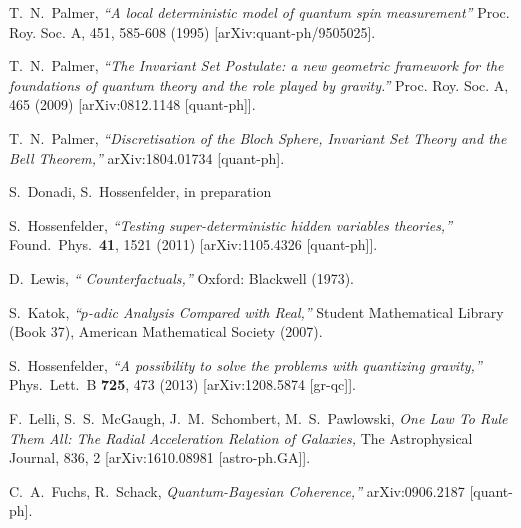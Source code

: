 \documentclass[12pt]{article}
\begin{document}
\begin{thebibliography}{99}
  T.~N.~Palmer,
  {\sl ``A local deterministic model of quantum spin measurement''}
  Proc. Roy. Soc. A, 451, 585-608 (1995) 	[arXiv:quant-ph/9505025]. 
 

  T.~N.~Palmer,
  {\sl ``The Invariant Set Postulate: a new geometric framework for the foundations of quantum theory and the role played by gravity.''}
  Proc. Roy. Soc. A, 465 (2009) 	[arXiv:0812.1148 [quant-ph]]. 


  T.~N.~Palmer,
  {\sl ``Discretisation of the Bloch Sphere, Invariant Set Theory and the Bell Theorem,''}
  arXiv:1804.01734 [quant-ph].
  
   S.~Donadi, S.~Hossenfelder, in preparation
  
  S.~Hossenfelder,
  {\sl ``Testing super-deterministic hidden variables theories,''}
  Found.\ Phys.\  {\bf 41}, 1521 (2011)
  [arXiv:1105.4326 [quant-ph]].
  
  D.~Lewis, {\sl `` Counterfactuals,''} Oxford: Blackwell (1973). 
  
   S.~Katok, {\sl ``$p$-adic Analysis Compared with Real,''} Student Mathematical Library (Book 37), American Mathematical Society (2007).

  S.~Hossenfelder,
  {\sl ``A possibility to solve the problems with quantizing gravity,''}
  Phys.\ Lett.\ B {\bf 725}, 473 (2013)
  [arXiv:1208.5874 [gr-qc]].

 F.~Lelli, S.~S.~McGaugh, J.~M.~Schombert, M.~S.~Pawlowski, {\sl One Law To Rule Them All: The Radial Acceleration Relation of Galaxies,} The Astrophysical Journal, 836, 2 [arXiv:1610.08981 [astro-ph.GA]].


  

 C.~A.~Fuchs,  R.~Schack, {\sl Quantum-Bayesian Coherence,''} arXiv:0906.2187 [quant-ph].
  
\end{thebibliography}
\end{document}
